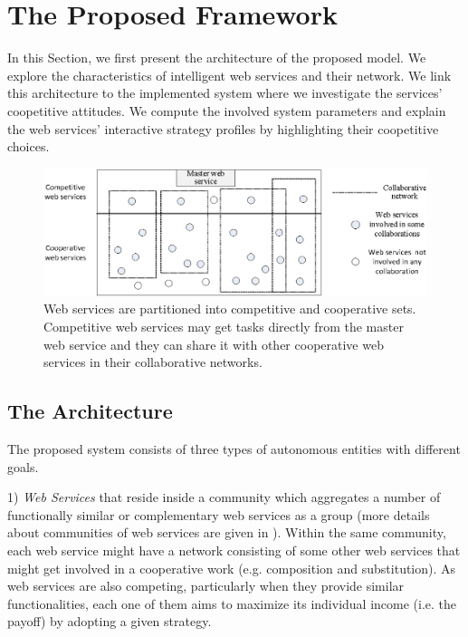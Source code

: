 \documentclass[runningheads,a4paper]{llncs}
\begin{document}
\section{The Proposed Framework}\label{The Proposed Framework}
In this Section, we first present the architecture of the proposed
model. We explore the characteristics of intelligent web services
and their network. We link this architecture to the implemented
system where we investigate the services' coopetitive attitudes.
We compute the involved system parameters and explain the web
services' interactive strategy profiles by highlighting their
coopetitive choices.

\begin{figure}[h]
\centering
\includegraphics[scale=1]{architecture++.eps}
\caption{Web services are partitioned into competitive and
cooperative sets. Competitive web services may get tasks directly
from the master web service and they can share it with other
cooperative web services in their collaborative networks.}
\label{architectureFigure}
\end{figure}

\subsection{The Architecture}

The proposed system consists of three types of autonomous entities
with different goals.

1) \textit{Web Services} that reside inside a community which
aggregates a number of functionally similar or complementary web
services as a group (more details about communities of web
services are given in \cite{Khosravifar2010}). Within the same
community, each web service might have a network consisting of
some other web services that might get involved in a cooperative
work (e.g. composition and substitution). As web services are also
competing, particularly when they provide similar functionalities,
each one of them aims to maximize its individual income (i.e. the
payoff) by adopting a given strategy.
\end{document}
